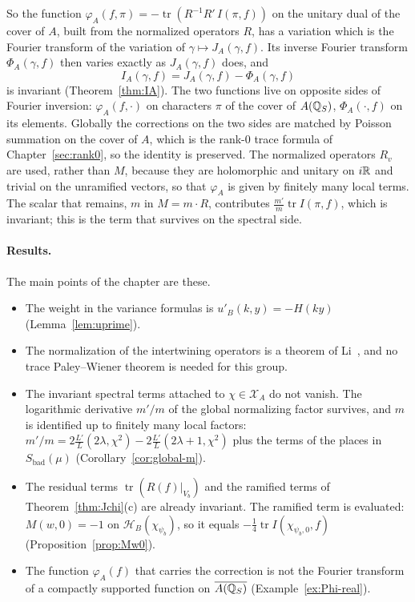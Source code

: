 So the function $\varphi_A(f,\pi)=-\operatorname{tr}(R^{-1}R'\,I(\pi,f))$
on the unitary dual of the cover of $A$, built from the normalized
operators $R$, has a variation which is the Fourier transform of the
variation of $\gamma\mapsto J_A(\gamma,f)$. Its inverse Fourier transform
$\Phi_A(\gamma,f)$ then varies exactly as $J_A(\gamma,f)$ does, and
\[
I_A(\gamma,f)=J_A(\gamma,f)-\Phi_A(\gamma,f)
\]
is invariant (Theorem~\ref{thm:IA}). The two functions live on opposite
sides of Fourier inversion: $\varphi_A(f,\cdot)$ on characters $\pi$ of
the cover of $A(\mathbb{Q}_S)$, $\Phi_A(\cdot,f)$ on its elements. Globally the
corrections on the two sides are matched by Poisson summation on the
cover of $A$, which is the rank-$0$ trace formula of
Chapter~\ref{sec:rank0}, so the identity is preserved. The normalized
operators $R_v$ are used, rather than $M$, because they are holomorphic
and unitary on $i\mathbb{R}$ and trivial on the unramified vectors, so that
$\varphi_A$ is given by finitely many local terms. The scalar that
remains, $m$ in $M=m\cdot R$, contributes $\frac{m'}m\operatorname{tr}
I(\pi,f)$, which is invariant; this is the term that survives on the
spectral side.

\paragraph{Results.} The main points of the chapter are these.
\begin{itemize}
\item The weight in the variance formulas is $u'_B(k,y)=-H(ky)$
  (Lemma~\ref{lem:uprime}).
\item The normalization of the intertwining operators is a theorem of
  Li~\cite{Li12a}, and no trace Paley--Wiener theorem is needed for this
  group.
\item The invariant spectral terms attached to $\chi\in\mathcal X_A$ do
  not vanish. The logarithmic derivative $m'/m$ of the global normalizing
  factor survives, and $m$ is identified up to finitely many local
  factors: $m'/m=2\frac{L'}{L}(2\lambda,\chi^2)-2\frac{L'}{L}(2\lambda+1,
  \chi^2)$ plus the terms of the places in $S_{\mathrm{bad}}(\mu)$
  (Corollary~\ref{cor:global-m}).
\item The residual terms $\operatorname{tr}(R(f)|_{V_b})$ and the ramified
  terms of Theorem~\ref{thm:Jchi}(c) are already invariant. The ramified
  term is evaluated: $M(w,0)=-1$ on $\mathcal H_B(\chi_{\psi_b})$, so it
  equals $-\frac14\operatorname{tr}I(\chi_{\psi_b,0},f)$
  (Proposition~\ref{prop:Mw0}).
\item The function $\varphi_A(f)$ that carries the correction is not the
  Fourier transform of a compactly supported function on $\overline{A(\mathbb{Q}_S)}$
  (Example~\ref{ex:Phi-real}).
\end{itemize}

